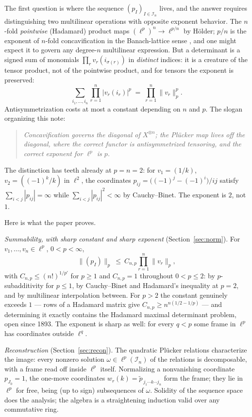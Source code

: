\documentclass[11pt]{amsart}
\theoremstyle{definition}
\begin{document}
The first question is where the sequence $(p_I)_{I\in\mathcal I_n}$ lives, and the answer requires distinguishing two multilinear operations with opposite exponent behavior. The $n$-fold \emph{pointwise} (Hadamard) product maps $(\ell^p)^n\to\ell^{p/n}$ by H\"older; $p/n$ is the exponent of $n$-fold concavification in the Banach-lattice sense \cite{LT2}, and one might expect it to govern any degree-$n$ multilinear expression. But a determinant is a signed sum of monomials $\prod_r v_r(i_{\sigma(r)})$ in \emph{distinct} indices: it is a creature of the tensor product, not of the pointwise product, and for tensors the exponent is preserved:
\[
\sum_{i_1,\dots,i_n}\prod_{r=1}^n |v_r(i_r)|^p \;=\; \prod_{r=1}^n\|v_r\|_p^p .
\]
Antisymmetrization costs at most a constant depending on $n$ and $p$. The slogan organizing this note:

\begin{quote}
\emph{Concavification governs the diagonal of $X^{\otimes n}$; the Pl\"ucker map lives off the diagonal, where the correct functor is antisymmetrized tensoring, and the correct exponent for $\ell^p$ is $p$.}
\end{quote}

The distinction has teeth already at $p=n=2$: for $v_1=(1/k)$, $v_2=((-1)^k/k)$ in $\ell^2$, the coordinates $p_{ij}=\big((-1)^j-(-1)^i\big)/ij$ satisfy $\sum_{i<j}|p_{ij}|=\infty$ while $\sum_{i<j}|p_{ij}|^2<\infty$ by Cauchy--Binet. The exponent is $2$, not $1$.

Here is what the paper proves.

\emph{Summability, with sharp constant and sharp exponent} (Section~\ref{sec:norm}). For $v_1,\dots,v_n\in\ell^p$, $0<p<\infty$,
\[
\big\|(p_I)\big\|_{p}\ \le\ C_{n,p}\prod_{r=1}^n\|v_r\|_p ,
\]
with $C_{n,p}\le(n!)^{1/p'}$ for $p\ge1$ and $C_{n,p}=1$ throughout $0<p\le2$: by $p$-subadditivity for $p\le1$, by Cauchy--Binet and Hadamard's inequality at $p=2$, and by multilinear interpolation between. For $p>2$ the constant genuinely exceeds $1$ --- rows of a Hadamard matrix give $C_{n,p}\ge n^{n(1/2-1/p)}$ --- and determining it exactly contains the Hadamard maximal determinant problem, open since 1893. The exponent is sharp as well: for every $q<p$ some frame in $\ell^p$ has coordinates outside $\ell^q$.

\emph{Reconstruction} (Section~\ref{sec:recon}). The quadratic Pl\"ucker relations characterize the image: every nonzero solution $\omega\in\ell^p(\mathcal I_n)$ of the relations is decomposable, with a frame read off inside $\ell^p$ itself. Normalizing a nonvanishing coordinate $p_{J_0}=1$, the one-move coordinates $w_r(k)=\tilde p_{\,j_1\cdots k\cdots j_n}$ form the frame; they lie in $\ell^p$ for free, being (up to sign) subsequences of $\omega$. Solidity of the sequence space does the analysis; the algebra is a straightening induction valid over any commutative ring.
\end{document}
